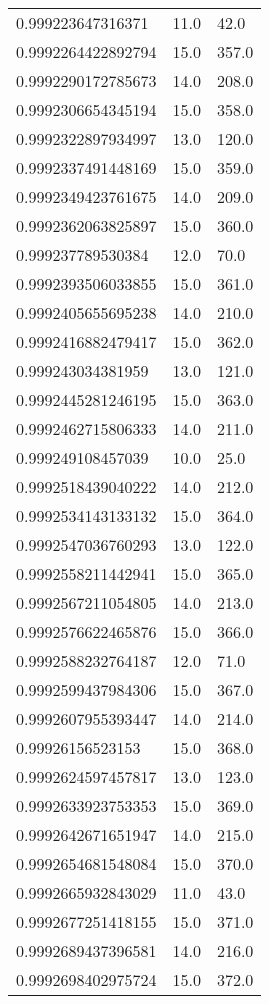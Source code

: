 \begin{center}
\begin{supertabular}[H]{p{0.30\textwidth}p{0.05\textwidth}p{0.05\textwidth}}
0.999223647316371 & 11.0 & 42.0 \\ 
0.9992264422892794 & 15.0 & 357.0 \\ 
0.9992290172785673 & 14.0 & 208.0 \\ 
0.9992306654345194 & 15.0 & 358.0 \\ 
0.9992322897934997 & 13.0 & 120.0 \\ 
0.9992337491448169 & 15.0 & 359.0 \\ 
0.9992349423761675 & 14.0 & 209.0 \\ 
0.9992362063825897 & 15.0 & 360.0 \\ 
0.999237789530384 & 12.0 & 70.0 \\ 
0.9992393506033855 & 15.0 & 361.0 \\ 
0.9992405655695238 & 14.0 & 210.0 \\ 
0.9992416882479417 & 15.0 & 362.0 \\ 
0.999243034381959 & 13.0 & 121.0 \\ 
0.9992445281246195 & 15.0 & 363.0 \\ 
0.9992462715806333 & 14.0 & 211.0 \\ 
0.999249108457039 & 10.0 & 25.0 \\ 
0.9992518439040222 & 14.0 & 212.0 \\ 
0.9992534143133132 & 15.0 & 364.0 \\ 
0.9992547036760293 & 13.0 & 122.0 \\ 
0.9992558211442941 & 15.0 & 365.0 \\ 
0.9992567211054805 & 14.0 & 213.0 \\ 
0.9992576622465876 & 15.0 & 366.0 \\ 
0.9992588232764187 & 12.0 & 71.0 \\ 
0.9992599437984306 & 15.0 & 367.0 \\ 
0.9992607955393447 & 14.0 & 214.0 \\ 
0.99926156523153 & 15.0 & 368.0 \\ 
0.9992624597457817 & 13.0 & 123.0 \\ 
0.9992633923753353 & 15.0 & 369.0 \\ 
0.9992642671651947 & 14.0 & 215.0 \\ 
0.9992654681548084 & 15.0 & 370.0 \\ 
0.9992665932843029 & 11.0 & 43.0 \\ 
0.9992677251418155 & 15.0 & 371.0 \\ 
0.9992689437396581 & 14.0 & 216.0 \\ 
0.9992698402975724 & 15.0 & 372.0 \\ 

\end{supertabular}
\end{center}
